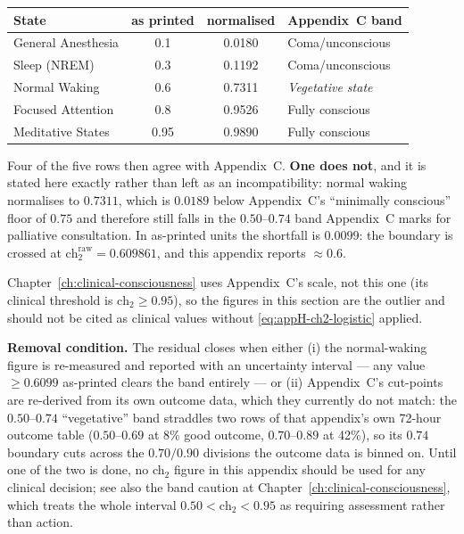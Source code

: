 \begin{center}
\footnotesize
\begin{tabular}{lccl}
\toprule
\textbf{State} & \textbf{as printed} & \textbf{normalised} & \textbf{Appendix~C band} \\
\midrule
General Anesthesia & 0.1  & 0.0180 & Coma/unconscious \\
Sleep (NREM)       & 0.3  & 0.1192 & Coma/unconscious \\
Normal Waking      & 0.6  & 0.7311 & \emph{Vegetative state} \\
Focused Attention  & 0.8  & 0.9526 & Fully conscious \\
Meditative States  & 0.95 & 0.9890 & Fully conscious \\
\bottomrule
\end{tabular}
\end{center}

\noindent Four of the five rows then agree with Appendix~C. \textbf{One does
not}, and it is stated here exactly rather than left as an incompatibility:
normal waking normalises to $0.7311$, which is $0.0189$ below Appendix~C's
``minimally conscious'' floor of $0.75$ and therefore still falls in the
$0.50$--$0.74$ band Appendix~C marks for palliative consultation. In
as-printed units the shortfall is $0.0099$: the boundary is crossed at
$\text{ch}_2^{\text{raw}} = 0.609861$, and this appendix reports $\approx 0.6$.

\noindent Chapter~\ref{ch:clinical-consciousness} uses Appendix~C's scale, not
this one (its clinical threshold is $\text{ch}_2 \geq 0.95$), so the figures in
this section are the outlier and should not be cited as clinical values without
\eqref{eq:appH-ch2-logistic} applied.

\noindent\textbf{Removal condition.} The residual closes when either (i) the
normal-waking figure is re-measured and reported with an uncertainty interval
--- any value $\geq 0.6099$ as-printed clears the band entirely --- or (ii)
Appendix~C's cut-points are re-derived from its own outcome data, which they
currently do not match: the $0.50$--$0.74$ ``vegetative'' band straddles two
rows of that appendix's own 72-hour outcome table ($0.50$--$0.69$ at 8\% good
outcome, $0.70$--$0.89$ at 42\%), so its $0.74$ boundary cuts across the
$0.70/0.90$ divisions the outcome data is binned on. Until one of the two is
done, no ch$_2$ figure in this appendix should be used for any clinical
decision; see also the band caution at
Chapter~\ref{ch:clinical-consciousness}, which treats the whole interval
$0.50 < \text{ch}_2 < 0.95$ as requiring assessment rather than action.

